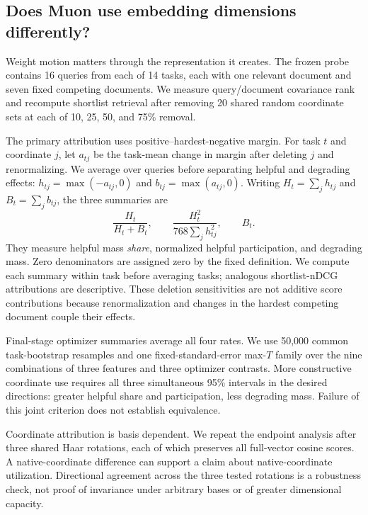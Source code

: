 \documentclass[11pt]{article}
\begin{document}
\subsection{Does Muon use embedding dimensions differently?}

Weight motion matters through the representation it creates. The frozen probe contains 16 queries
from each of 14 tasks, each with one relevant document and seven fixed competing documents.
We measure query/document covariance rank and recompute shortlist retrieval after removing
20 shared random coordinate sets at each of 10, 25, 50, and 75\% removal.

The primary attribution uses positive--hardest-negative margin. For task $t$ and coordinate $j$,
let $a_{tj}$ be the task-mean change in margin after deleting $j$ and renormalizing. We average
over queries before separating helpful and degrading effects:
$h_{tj}=\max(-a_{tj},0)$ and $b_{tj}=\max(a_{tj},0)$.
Writing $H_t=\sum_j h_{tj}$ and $B_t=\sum_j b_{tj}$, the three summaries are
\begin{equation}
\frac{H_t}{H_t+B_t},\qquad
\frac{H_t^2}{768\sum_j h_{tj}^2},\qquad B_t.
\label{eq:coordinate-utility}
\end{equation}
They measure helpful mass \emph{share}, normalized helpful participation, and degrading mass.
Zero denominators are assigned zero by the fixed definition. We compute each summary within task
before averaging tasks; analogous shortlist-nDCG attributions are descriptive. These deletion
sensitivities are not additive score contributions because renormalization and changes in the
hardest competing document couple their effects.

Final-stage optimizer summaries average all four rates. We use 50,000 common task-bootstrap
resamples and one fixed-standard-error max-$T$ family over the nine combinations of three features
and three optimizer contrasts. More constructive coordinate use requires all three simultaneous
95\% intervals in the desired directions: greater helpful share and participation, less degrading
mass. Failure of this joint criterion does not establish equivalence.

Coordinate attribution is basis dependent. We repeat the endpoint analysis after three shared Haar
rotations, each of which preserves all full-vector cosine scores. A native-coordinate difference can
support a claim about native-coordinate utilization. Directional agreement across the three tested
rotations is a robustness check, not proof of invariance under arbitrary bases or of greater
dimensional capacity.
\end{document}
